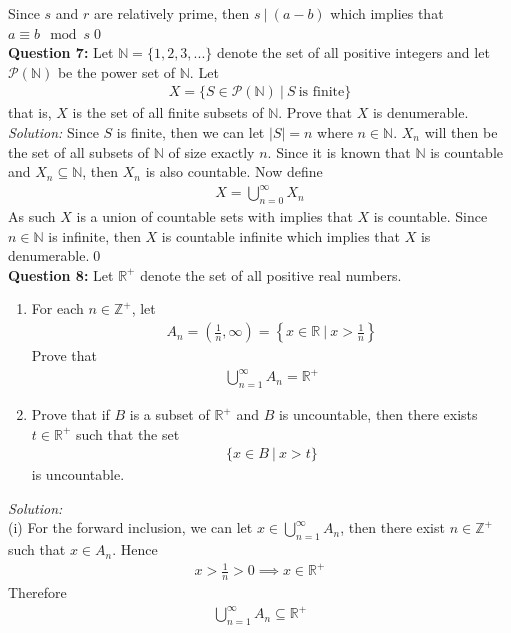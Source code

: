\documentclass[12pt]{article}
\newcommand{\R}{\mathbb{R}}
\newcommand{\Z}{\mathbb{Z}}
\newcommand{\N}{\mathbb{N}}
\begin{document}
Since $s$ and $r$ are relatively prime, then $s\ |\ (a-b)$ which implies that $a\equiv b\mod s$\qed\\[2em]
\textbf{Question 7:} Let $\N=\{1,2,3,...\}$ denote the set of all positive integers and let $\mathcal{P}(\N)$ be the power set of $\N$. Let
\begin{align*}
    X=\{S\in\mathcal{P}(\N)\ |\ S\ \text{is finite}\}
\end{align*}
that is, $X$ is the set of all finite subsets of $\N$. Prove that $X$ is denumerable.\\[2em]
\emph{Solution:} Since $S$ is finite, then we can let $|S|=n$ where $n\in\N$. $X_n$ will then be the set of all subsets of $\N$ of size exactly $n$. Since it is known that $\N$ is countable and $X_n\subseteq \N$, then $X_n$ is also countable. Now define
\begin{align*}
    X=\bigcup_{n=0}^\infty X_n
\end{align*}
As such $X$ is a union of countable sets with implies that $X$ is countable. Since $n\in\N$ is infinite, then $X$ is countable infinite which implies that $X$ is denumerable.\qed\\[2em]
\textbf{Question 8:} Let $\R^+$ denote the set of all positive real numbers.
\begin{enumerate}[label=\roman*)]
    \item For each $n\in\Z^+$, let
    \begin{align*}
        A_n=\left(\frac{1}{n},\infty\right)=\left\{x\in\R\ |\ x>\frac{1}{n}\right\}
    \end{align*}
    Prove that
    \begin{align*}
        \bigcup_{n=1}^\infty A_n=\R^+
        \end{align*}
        \item Prove that if $B$ is a subset of $\R^+$ and $B$ is uncountable, then there exists $t\in\R^+$ such that the set
        \begin{align*}
            \{x\in B\ |\ x>t\}
        \end{align*}
        is uncountable.
\end{enumerate}
\emph{Solution:}\\
(i) For the forward inclusion, we can let $x\in\displaystyle{\bigcup_{n=1}^\infty A_n}$, then there exist $n\in\Z^+$ such that $x\in A_n$. Hence
\begin{align*}
    x>\frac{1}{n}>0\implies x\in \R^+
\end{align*}
Therefore
\begin{align*}
    \bigcup_{n=1}^\infty A_n\subseteq \R^+
\end{align*}
\end{document}

